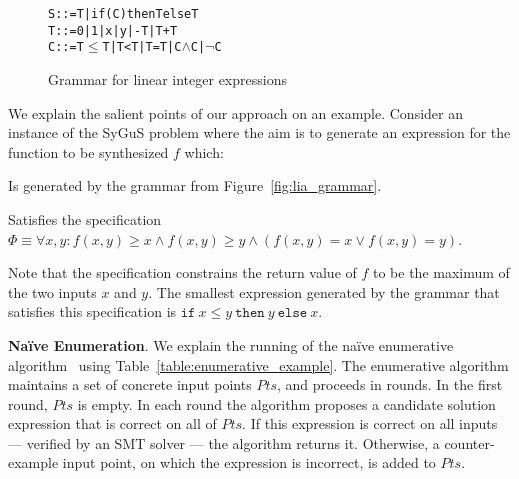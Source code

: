 \documentclass{llncs}
\newcommand\Points{\mathit{Pts}}
\newcommand\Spec{\Phi}
\newcommand\SynthFun{f}
\newcommand\ITE[3]{\mathtt{if}~#1~\mathtt{then}~#2~\mathtt{else}~#3}
\newcommand{\sygus}{{\sffamily\fontsize{8.5}{10}\selectfont
    SyGuS}\xspace}
\renewcommand{\paragraph}[1]{\par\noindent\textbf{#1}.}
\begin{document}
\begin{figure}[t]
  \vspace{-1ex}
  \begin{alltt}
    S ::= T | if (C) then T else T
    T ::= 0 | 1 | x | y | -T | T + T
    C ::= T \(\leq\) T | T < T | T = T | C \(\wedge\) C | \(\neg\) C
  \end{alltt}
  \vspace{-4ex}
  \caption{Grammar for linear integer expressions}
  \label{fig:grammar}
\end{figure}
We explain the salient points of our approach on an example.
Consider an instance of the \sygus problem where the aim is to generate
an expression for the function to be synthesized $\SynthFun$ which:
\begin{compactitem}
\item Is generated by the grammar from Figure~\ref{fig:lia_grammar}.
\item Satisfies the specification $\Spec \equiv \forall x, y :
  \SynthFun(x, y) \geq x \wedge \SynthFun(x, y) \geq y \wedge
  (\SynthFun(x,y) = x \vee \SynthFun(x,y) = y)$.
\end{compactitem}
Note that the specification constrains the return value of $\SynthFun$
to be the maximum of the two inputs $x$ and $y$.
The smallest expression generated by the grammar that satisfies this
specification is $\ITE{x \leq y}{y}{x}$.

\paragraph{Na\"ive Enumeration}
We explain the running of the na\"ive enumerative
algorithm~\cite{udupa-transit} using
Table~\ref{table:enumerative_example}.
The enumerative algorithm maintains a set of concrete input points
$\Points$, and proceeds in rounds.
In the first round, $\Points$ is empty.
In each round the algorithm proposes a candidate solution expression
that is correct on all of $\Points$.
If this expression is correct on all inputs --- verified by an SMT
solver --- the algorithm returns it.
Otherwise, a counter-example input point, on which the expression is
incorrect, is added to $\Points$.
\end{document}

